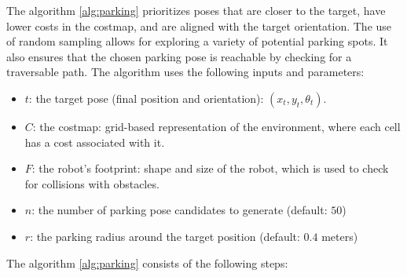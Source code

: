 The algorithm \ref{alg:parking} prioritizes poses that are closer to the target, have lower costs in the costmap, 
and are aligned with the target orientation. The use of random sampling allows for exploring a variety of potential parking spots.
It also ensures that the chosen parking pose is reachable by checking for a traversable path.
The algorithm uses the following inputs and parameters:
\begin{itemize}
    \item $t$: the target pose (final position and orientation): $(x_t, y_t, \theta_t)$.
    \item $C$: the costmap: grid-based representation of the environment, where each cell has a cost associated with it.
    \item $F$: the robot's footprint: shape and size of the robot, which is used to check for collisions with obstacles.
    \item $n$: the number of parking pose candidates to generate (default: $50$)
    \item $r$: the parking radius around the target position (default: $0.4$ meters)
\end{itemize}

The algorithm \ref{alg:parking} consists of the following steps:

